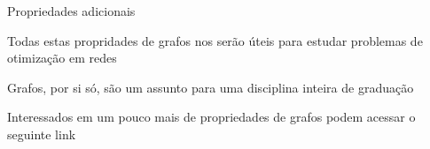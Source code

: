 \documentclass[compress,mathserif]{beamer}
\begin{document}

\begin{frame}{Propriedades adicionais}

Todas estas propridades de grafos nos serão úteis para estudar problemas de otimização em redes

\vspace{0.5cm}

Grafos, por si só, são um assunto para uma disciplina inteira de graduação

\vspace{0.5cm}

Interessados em um pouco mais de propriedades de grafos podem acessar o seguinte link \href{https://www.inf.ufsc.br/grafos/definicoes/definicao.html}{}

\end{frame}
\end{document}
